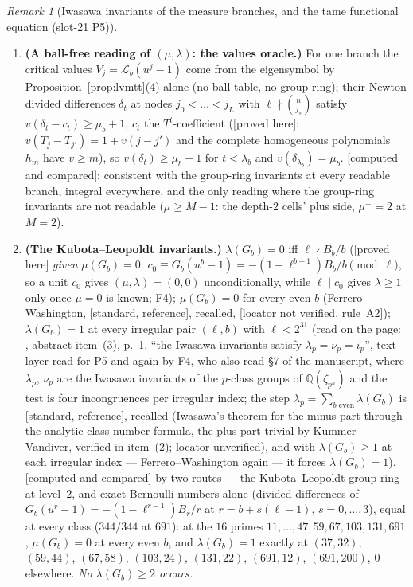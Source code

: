\documentclass[11pt]{article}
\theoremstyle{remark}
\newtheorem{remark}[theorem]{Remark}
\newcommand{\Q}{\mathbb{Q}}
\newcommand{\PROVED}{\textsf{[proved here]}}
\newcommand{\STD}{\textsf{[standard, reference]}}
\newcommand{\CMPD}{\textsf{[computed and compared]}}   %
\newcommand{\VERIFYloc}{\textsf{[locator not verified, rule~A2]}} %
\begin{document}
\begin{remark}[Iwasawa invariants of the measure branches, and the tame functional equation (slot-21 P5)]
\begin{enumerate}
\item \textbf{(A ball-free reading of $(\mu,\lambda)$: the values oracle.)} For one branch the critical values $V_j=\mathcal L_b(u^{j}-1)$ come from the eigensymbol by Proposition~\ref{prop:lvmtt}(4) alone (no
  ball table, no group ring); their Newton divided differences $\delta_t$ at nodes $j_0<\dots<j_L$ with $\ell\nmid\binom n{j_s}$ satisfy $v(\delta_t-c_t)\ge\mu_b+1$, $c_t$ the $T^{t}$-coefficient (\PROVED:
  $v(T_j-T_{j'})=1+v(j-j')$ and the complete homogeneous polynomials $h_m$ have $v\ge m$), so $v(\delta_t)\ge\mu_b+1$ for $t<\lambda_b$ and $v(\delta_{\lambda_b})=\mu_b$. \CMPD: consistent with the group-ring
  invariants at every readable branch, integral everywhere, and the only reading where the group-ring invariants are not readable ($\mu\ge M-1$: the depth-$2$ cells' plus side, $\mu^{+}=2$ at $M=2$).
\item \textbf{(The Kubota--Leopoldt invariants.)} $\lambda(G_b)=0$ iff $\ell\nmid B_b/b$ (\PROVED{} \emph{given} $\mu(G_b)=0$: $c_0\equiv G_b(u^{b}-1)=-(1-\ell^{b-1})B_b/b\pmod\ell$, so a unit $c_0$ gives
  $(\mu,\lambda)=(0,0)$ unconditionally, while $\ell\mid c_0$ gives $\lambda\ge1$ only once $\mu=0$ is known; F4); $\mu(G_b)=0$ for every even $b$
  (Ferrero--Washington, \STD, recalled, \VERIFYloc); $\lambda(G_b)=1$ at every irregular pair $(\ell,b)$ with $\ell<2^{31}$ (read on the page: \cite{hho}, abstract item~(3), p.~1, ``the Iwasawa invariants satisfy
  $\lambda_p=\nu_p=i_p$'', text layer read for P5 and again by F4, who also read \S7 of the manuscript, where $\lambda_p$, $\nu_p$ are the Iwasawa invariants of the $p$-class groups of $\Q(\zeta_{p^{n}})$ and the
  test is four incongruences per irregular index; the step $\lambda_p=\sum_{b\text{ even}}\lambda(G_b)$ is \STD, recalled (Iwasawa's theorem for the minus part through the analytic class number formula, the plus
  part trivial by Kummer--Vandiver, verified in \cite{hho} item~(2); locator unverified), and with $\lambda(G_b)\ge1$ at each irregular index --- Ferrero--Washington again --- it forces $\lambda(G_b)=1$). \CMPD{} by two routes --- the
  Kubota--Leopoldt group ring at level~$2$, and exact Bernoulli numbers alone (divided differences of $G_b(u^{r}-1)=-(1-\ell^{r-1})B_r/r$ at $r=b+s(\ell-1)$, $s=0,\dots,3$), equal at every class ($344/344$ at
  $691$): at the $16$ primes $11,\dots,47,59,67,103,131,691$, $\mu(G_b)=0$ at every even $b$, and $\lambda(G_b)=1$ exactly at $(37,32)$, $(59,44)$, $(67,58)$, $(103,24)$, $(131,22)$, $(691,12)$,
  $(691,200)$, $0$ elsewhere. \emph{No $\lambda(G_b)\ge2$ occurs.}

\end{enumerate}
\end{remark}
\end{document}
